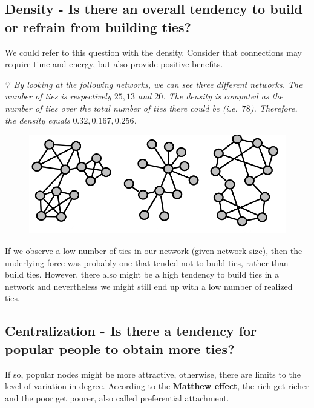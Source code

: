 \documentclass[
  notitlepage,
  onecolumn,
  openany]{book}
\begin{document}
\hypertarget{density---is-there-an-overall-tendency-to-build-or-refrain-from-building-ties}{%
\subsection{Density - Is there an overall tendency to build or refrain from building ties?}\label{density---is-there-an-overall-tendency-to-build-or-refrain-from-building-ties}}

We could refer to this question with the density. Consider that connections may require time and energy, but also provide positive benefits.

💡 \emph{By looking at the following networks, we can see three different networks. The number of ties is respectively \(25, 13\) and \(20\). The density is computed as the number of ties over the total number of ties there could be (i.e.~\(78\)). Therefore, the density equals \(0.32, 0.167, 0.256\).}

\begin{figure}[h!]

{\centering \includegraphics[width=0.5\linewidth]{images/13-ERGMs/Untitled} 

}

\end{figure}

If we observe a low number of ties in our network (given network size), then the underlying force was probably one that tended not to build ties, rather than build ties. However, there also might be a high tendency to build ties in a network and nevertheless we might still end up with a low number of realized ties.

\hypertarget{centralization---is-there-a-tendency-for-popular-people-to-obtain-more-ties}{%
\subsection{Centralization - Is there a tendency for popular people to obtain more ties?}\label{centralization---is-there-a-tendency-for-popular-people-to-obtain-more-ties}}

If so, popular nodes might be more attractive, otherwise, there are limits to the level of variation in degree. According to the \textbf{Matthew effect}, the rich get richer and the poor get poorer, also called preferential attachment.
\end{document}
